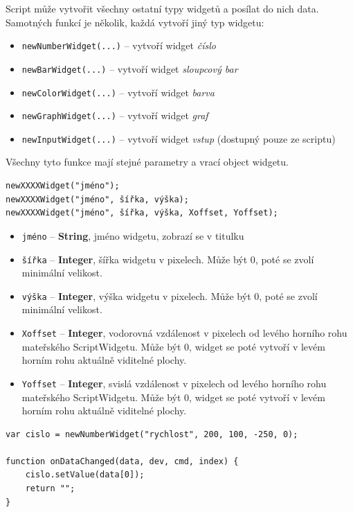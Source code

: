\documentclass[12pt, a4paper, oneside]{article}
\newcommand{\It}{\textit}  %
\begin{document}
Script může vytvořit všechny ostatní typy widgetů a posílat do nich data. Samotných funkcí je několik, každá vytvoří jiný typ widgetu:
\begin{itemize}
    \item {\color{blue}\verb/newNumberWidget(...)/} -- vytvoří widget \It{číslo}
    \item {\color{blue}\verb/newBarWidget(...)/} -- vytvoří widget \It{sloupcový bar}
    \item {\color{blue}\verb/newColorWidget(...)/} -- vytvoří widget \It{barva}
    \item {\color{blue}\verb/newGraphWidget(...)/} -- vytvoří widget \It{graf}
    \item {\color{blue}\verb/newInputWidget(...)/} -- vytvoří widget \It{vstup} (dostupný pouze ze scriptu)
\end{itemize}

Všechny tyto funkce mají stejné parametry a vrací object widgetu.
{\color{blue}
\begin{verbatim}newXXXXWidget("jméno");
newXXXXWidget("jméno", šířka, výška);
newXXXXWidget("jméno", šířka, výška, Xoffset, Yoffset);
\end{verbatim}
}

\begin{itemize}
    \item \verb/jméno/ -- {\bf String}, jméno widgetu, zobrazí se v titulku
    \item \verb/šířka/ -- {\bf Integer}, šířka widgetu v pixelech. Může být 0, poté se zvolí minimální velikost.
    \item \verb/výška/ -- {\bf Integer}, výška widgetu v pixelech. Může být 0, poté se zvolí minimální velikost.
    \item \verb/Xoffset/ -- {\bf Integer}, vodorovná vzdálenost v pixelech od levého horního rohu mateřského ScriptWidgetu. Může být 0, widget se poté vytvoří v levém horním rohu aktuálně viditelné plochy.
     \item \verb/Yoffset/ -- {\bf Integer}, svislá vzdálenost v pixelech od levého horního rohu mateřského ScriptWidgetu. Může být 0, widget se poté vytvoří v levém horním rohu aktuálně viditelné plochy.
\end{itemize}

\noindent\begin{minipage}{\textwidth}
\begin{lstlisting}[caption=Vytvoření widgetu \It{číslo} a nastavení jeho hodnoty z příchozích dat]
var cislo = newNumberWidget("rychlost", 200, 100, -250, 0);

function onDataChanged(data, dev, cmd, index) {
    cislo.setValue(data[0]);
    return "";
}
\end{lstlisting}
\end{minipage}
\end{document}

